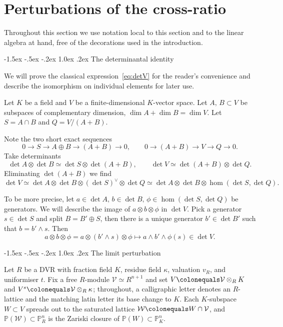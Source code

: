\documentclass[11pt,a4paper]{amsart}
\makeatletter
\renewcommand\subsection{\@startsection{subsection}{2}{\z@}
                                   {-1.5ex \@plus -.5ex \@minus -.2ex}%
                                   {1.0ex \@plus.2ex}%
                                   {\normalfont\itshape}}%
\newcommand{\Pp}{\mathbb{P}}
\newcommand{\pn}{\mathbb{P}^{n}}
\theoremstyle{plain}
\theoremstyle{definition}
\theoremstyle{remark}
\newcommand{\cw}{\mathcal{W}}
\newcommand{\cv}{\mathcal{V}}
\newcommand{\coleq}{\colonequals}
\makeatother
\begin{document}
\section{Perturbations of the cross-ratio}\label{sec:limit}

Throughout this section we use notation local to this section and to the linear algebra at hand, free of the decorations used in the introduction.

\subsection{The determinantal identity}

We will prove the classical expression~\eqref{eq:detV} for the reader's convenience and describe the isomorphism on individual elements for later use.

Let $K$ be a field and $V$ be a finite-dimensional $K$-vector space. Let $A, \, B \subset V$ be subspaces of complementary dimension, $\dim A + \dim B = \dim V$. Let $S = A \cap B$ and $Q = V/(A+B)$. 

Note the two short exact sequences
\[
  0 \to S \to A \oplus B \to (A+B) \to 0, \qquad 0 \to (A+B) \to V \to Q \to 0.
\]
Take determinants
\[
  \det A \otimes \det B \simeq  \det S \otimes \det(A+B), \qquad \det V \simeq  \det (A+B) \otimes \det Q.
\]
Eliminating $\det(A+B)$ we find
\begin{equation}
  \label{eq:detV_in_proof}
  \det V \simeq \det A \otimes \det B \otimes (\det S)^\vee \otimes \det Q \simeq \det A \otimes \det B \otimes \hom(\det S, \det Q).
\end{equation}

To be more precise, let $a \in \det A,\, b \in \det B, \, \phi \in \hom(\det S, \det Q)$ be generators. We will describe the image of $a \otimes b \otimes \phi$ in $\det V$. Pick a generator $s \in \det S$ and split $B = B' \oplus S$, then there is a unique generator $b' \in \det B'$ such that $b = b' \wedge s$. Then
\begin{equation}
  a \otimes b \otimes \phi = a \otimes (b' \wedge s) \otimes \phi \mapsto a \wedge b' \wedge \phi(s) \in \det V.
\end{equation}

\subsection{The limit perturbation}

Let $R$ be a DVR with fraction field $K$, residue field $\kappa$, valuation $v_R$, and uniformiser $t$. Fix a free $R$-module $\cv \simeq R^{n+1}$ and set $V \coleq \cv \otimes_R K$ and $V^s \coleq \cv \otimes_R \kappa$; throughout, a calligraphic letter denotes an $R$-lattice and the matching latin letter its base change to $K$. Each $K$-subspace $W \subset V$ spreads out to the saturated lattice $\cw \coleq W \cap \cv$, and $\Pp(\cw) \subset \pn_R$ is the Zariski closure of $\Pp(W) \subset \pn_K$.
\end{document}
